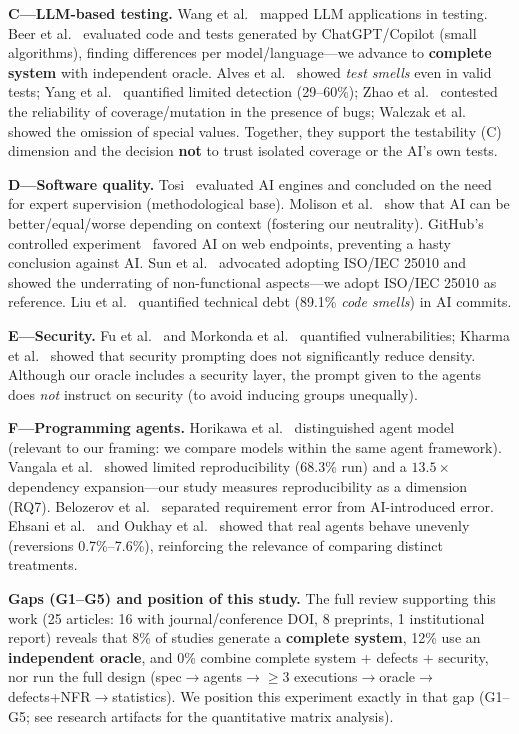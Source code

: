 \documentclass[11pt]{article}
\begin{document}
\textbf{C---LLM-based testing.} Wang et al.~\cite{C01} mapped LLM applications in testing. Beer et al.~\cite{C02} evaluated code and tests generated by ChatGPT/Copilot (small algorithms), finding differences per model/language---we advance to \textbf{complete system} with independent oracle. Alves et al.~\cite{C03} showed \emph{test smells} even in valid tests; Yang et al.~\cite{C04} quantified limited detection (29--60\%); Zhao et al.~\cite{C05} contested the reliability of coverage/mutation in the presence of bugs; Walczak et al.~\cite{C06} showed the omission of special values. Together, they support the testability (C) dimension and the decision \textbf{not} to trust isolated coverage or the AI's own tests.

\textbf{D---Software quality.} Tosi~\cite{D01} evaluated AI engines and concluded on the need for expert supervision (methodological base). Molison et al.~\cite{D02} show that AI can be better/equal/worse depending on context (fostering our neutrality). GitHub's controlled experiment~\cite{D03} favored AI on web endpoints, preventing a hasty conclusion against AI. Sun et al.~\cite{D04} advocated adopting ISO/IEC 25010 and showed the underrating of non-functional aspects---we adopt ISO/IEC 25010 as reference. Liu et al.~\cite{D05} quantified technical debt (89.1\% \emph{code smells}) in AI commits.

\textbf{E---Security.} Fu et al.~\cite{E01} and Morkonda et al.~\cite{E02} quantified vulnerabilities; Kharma et al.~\cite{E03} showed that security prompting does not significantly reduce density. Although our oracle includes a security layer, the prompt given to the agents does \emph{not} instruct on security (to avoid inducing groups unequally).

\textbf{F---Programming agents.} Horikawa et al.~\cite{F01} distinguished agent model (relevant to our framing: we compare models within the same agent framework). Vangala et al.~\cite{F02} showed limited reproducibility (68.3\% run) and a $13.5\times$ dependency expansion---our study measures reproducibility as a dimension (RQ7). Belozerov et al.~\cite{F03} separated requirement error from AI-introduced error. Ehsani et al.~\cite{F04} and Oukhay et al.~\cite{F05} showed that real agents behave unevenly (reversions 0.7\%--7.6\%), reinforcing the relevance of comparing distinct treatments.

\textbf{Gaps (G1--G5) and position of this study.} The full review supporting this work (25 articles: 16 with journal/conference DOI, 8 preprints, 1 institutional report) reveals that 8\% of studies generate a \textbf{complete system}, 12\% use an \textbf{independent oracle}, and 0\% combine complete system + defects + security, nor run the full design (spec$\rightarrow$agents$\rightarrow$$\geq$3 executions$\rightarrow$oracle$\rightarrow$defects+NFR$\rightarrow$statistics). We position this experiment exactly in that gap (G1--G5; see research artifacts for the quantitative matrix analysis).
\end{document}
